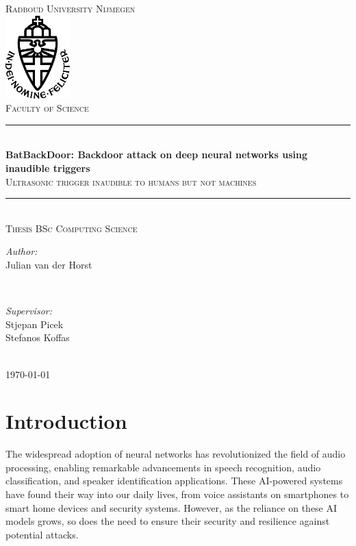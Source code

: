 \documentclass{report}
\title{\thesistitle}
\author{\thesisauthorfirst\space\thesisauthorsecond}
\date{\thesisdate}
\def\thesistitle{BatBackDoor: Backdoor attack on deep neural networks using inaudible triggers}
\def\thesissubtitle{Ultrasonic trigger inaudible to humans but not machines}
\def\thesisauthorfirst{Julian van der Horst}
\def\thesisauthorsecond{}
\def\thesissupervisorfirst{Stjepan Picek\\Stefanos Koffas}
\def\thesissupervisorsecond{}
\def\thesissecondreaderfirst{}
\def\thesissecondreadersecond{}
\def\thesisdate{May 2023}
\theoremstyle{definition}
\theoremstyle{remark}
\begin{document}
\begin{titlepage}
	\thispagestyle{empty}
	\newcommand{\HRule}{\rule{\linewidth}{0.5mm}}
	\center
	\textsc{\Large Radboud University Nijmegen}\\[.7cm]
	\includegraphics[width=25mm]{img/in_dei_nomine_feliciter.eps}\\[.5cm]
	\textsc{Faculty of Science}\\[0.5cm]
	
	\HRule \\[0.4cm]
	{ \huge \bfseries \thesistitle}\\[0.1cm]
	\textsc{\thesissubtitle}\\
	\HRule \\[.5cm]
	\textsc{\large Thesis BSc Computing Science}\\[.5cm]
	
	\begin{minipage}{0.4\textwidth}
	\begin{flushleft} \large
	\emph{Author:}\\
	\thesisauthorfirst\space \textsc{\thesisauthorsecond}
	\end{flushleft}
	\end{minipage}
	~
	\begin{minipage}{0.4\textwidth}
	\begin{flushright} \large
	\emph{Supervisor:} \\
	\thesissupervisorfirst\space \textsc{\thesissupervisorsecond} \\[1em]
	\end{flushright}
	\end{minipage}\\[4cm]
	\vfill
	{\large \today}\\
	\clearpage
\end{titlepage}

\tableofcontents

\chapter{Introduction}
The widespread adoption of neural networks has revolutionized the field of audio processing, enabling remarkable advancements in speech recognition, audio classification, and speaker identification applications. These AI-powered systems have found their way into our daily lives, from voice assistants on smartphones to smart home devices and security systems. However, as the reliance on these AI models grows, so does the need to ensure their security and resilience against potential attacks.
\end{document}
